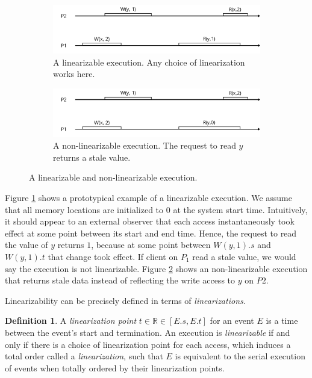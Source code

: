 \documentclass[]             %
{NASA}                       %
\theoremstyle{definition}
\newtheorem{definition}{Definition}[section]
\begin{document}
\begin{figure} \begin{subfigure}[a]{1\textwidth} \center
     \includegraphics[scale=0.4]{images/linear1.png} \caption{A
     linearizable execution. Any choice of linearization works here.}
     \label{fig:linear_example11} \end{subfigure}
     \begin{subfigure}[b]{1\textwidth} \center
     \includegraphics[scale=0.4]{images/nonlinear0.png} \caption{A
     non-linearizable execution. The request to read $y$ returns a
     stale value. } \label{fig:linear_example12} \end{subfigure}
     \caption{A linearizable and non-linearizable execution.}
     \label{fig:linear_example1} \end{figure}

Figure \ref{fig:linear_example11} shows a prototypical example of a
linearizable execution. We assume that all memory locations are
initialized to \(0\) at the system start time. Intuitively, it should
appear to an external observer that each access instantaneously took
effect at some point between its start and end time. Hence, the request
to read the value of \(y\) returns \(1\), because at some point between
\(W(y,1).s\) and \(W(y,1).t\) that change took effect. If client on
\(P_1\) read a stale value, we would say the execution is not
linearizable. Figure \ref{fig:linear_example12} shows an
non-linearizable execution that returns stale data instead of reflecting
the write access to \(y\) on \(P2\).

Linearizability can be precisely defined in terms of
\emph{linearizations.}

\begin{definition}
A \emph{linearization point} $t \in \mathbb{R} \in [E.s, E.t]$ for an
event $E$ is a time between the event's start and termination. An
execution is \emph{linearizable} if and only if there is a choice of
linearization point for each access, which induces a total order called a \emph{linearization},
such that $E$ is equivalent to
the serial execution of events when totally ordered by their
linearization points.
\end{definition}
\end{document}
